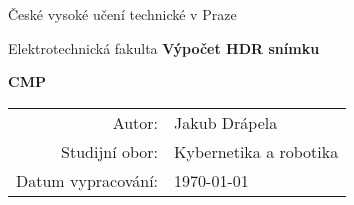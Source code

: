 \documentclass[11pt,a4paper]{article}
\author{Jakub Drápela}
\begin{document}
\pagestyle{empty}


	\begin{center}

\large

České vysoké učení technické v Praze

\medskip

Elektrotechnická fakulta
\vfill
\vfill
{\LARGE\bfseries Výpočet HDR snímku}


\vspace{15mm}

\vfill
\vfill
\vfill

{\LARGE\bfseries CMP}

\vfill

\begin{tabular}{rl}

Autor: & Jakub Drápela \\
\noalign{\vspace{2mm}}
Studijní obor: & Kybernetika a robotika \\
\noalign{\vspace{2mm}}
Datum vypracování: & \today\\
\end{tabular}

\end{center}

\newpage
\pagestyle{plain}     %
\setcounter{page}{1}  %

\clearpage
\nocite{*}
\printbibliography 
\end{document}
